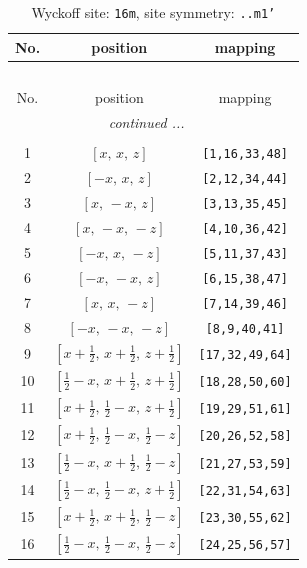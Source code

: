 \documentclass[fleqn,8pt]{jsarticle}
\begin{document}
\renewcommand{\arraystretch}{1.2}
\begin{longtable}{ccc}
\caption{Wyckoff site: {\tt 16m}, site symmetry: {\tt ..m1'}}
 \\
 \hline \hline
No. & position & mapping \\ \hline \endfirsthead

\multicolumn{2}{l}{\tablename\ \thetable{}} \\
 \hline \hline
No. & position & mapping \\ \hline \endhead

 \hline \hline
\multicolumn{2}{r}{\footnotesize\it continued ...} \\ \endfoot

 \hline \hline
\multicolumn{2}{r}{} \\ \endlastfoot

1 & $\left[ x,\, x,\, z \right]$ & {\tt [1,16,33,48]} \\ \hline
2 & $\left[ - x,\, x,\, z \right]$ & {\tt [2,12,34,44]} \\ \hline
3 & $\left[ x,\, - x,\, z \right]$ & {\tt [3,13,35,45]} \\ \hline
4 & $\left[ x,\, - x,\, - z \right]$ & {\tt [4,10,36,42]} \\ \hline
5 & $\left[ - x,\, x,\, - z \right]$ & {\tt [5,11,37,43]} \\ \hline
6 & $\left[ - x,\, - x,\, z \right]$ & {\tt [6,15,38,47]} \\ \hline
7 & $\left[ x,\, x,\, - z \right]$ & {\tt [7,14,39,46]} \\ \hline
8 & $\left[ - x,\, - x,\, - z \right]$ & {\tt [8,9,40,41]} \\ \hline
9 & $\left[ x + \frac{1}{2},\, x + \frac{1}{2},\, z + \frac{1}{2} \right]$ & {\tt [17,32,49,64]} \\ \hline
10 & $\left[ \frac{1}{2} - x,\, x + \frac{1}{2},\, z + \frac{1}{2} \right]$ & {\tt [18,28,50,60]} \\ \hline
11 & $\left[ x + \frac{1}{2},\, \frac{1}{2} - x,\, z + \frac{1}{2} \right]$ & {\tt [19,29,51,61]} \\ \hline
12 & $\left[ x + \frac{1}{2},\, \frac{1}{2} - x,\, \frac{1}{2} - z \right]$ & {\tt [20,26,52,58]} \\ \hline
13 & $\left[ \frac{1}{2} - x,\, x + \frac{1}{2},\, \frac{1}{2} - z \right]$ & {\tt [21,27,53,59]} \\ \hline
14 & $\left[ \frac{1}{2} - x,\, \frac{1}{2} - x,\, z + \frac{1}{2} \right]$ & {\tt [22,31,54,63]} \\ \hline
15 & $\left[ x + \frac{1}{2},\, x + \frac{1}{2},\, \frac{1}{2} - z \right]$ & {\tt [23,30,55,62]} \\ \hline
16 & $\left[ \frac{1}{2} - x,\, \frac{1}{2} - x,\, \frac{1}{2} - z \right]$ & {\tt [24,25,56,57]} \\
\end{longtable}
\end{document}
